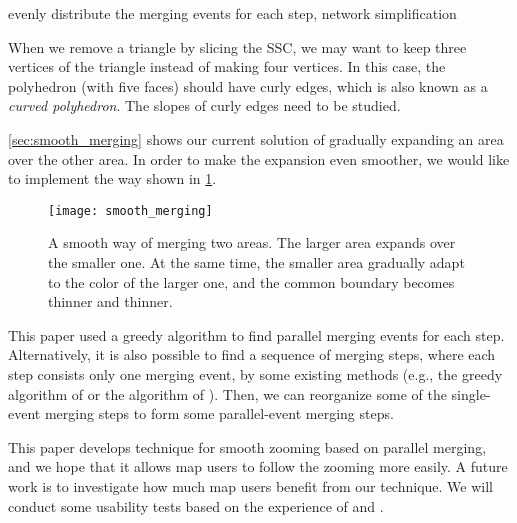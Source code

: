 \documentclass[ijgi,article,submit,moreauthors,pdftex]{Definitions/mdpi}
\begin{document}
evenly distribute the merging events for each step, 
network simplification

When we remove a triangle by slicing the SSC, 
we may want to keep three vertices of the triangle 
instead of making four vertices.
In this case, the polyhedron (with five faces) should have curly edges,
which is also known as a \emph{curved polyhedron}.
The slopes of curly edges need to be studied.

\sect\ref{sec:smooth_merging} shows our current solution of
gradually expanding an area over the other area.
In order to make the expansion even smoother,
we would like to implement the way 
shown in \fig\ref{fig:smooth_merging_future}.

\begin{figure}[tb]
\centering
\texttt{[image: smooth\_merging]}
\caption{A smooth way of merging two areas.
    The larger area expands over the smaller one.
    At the same time, 
    the smaller area gradually adapt to the color of the larger one,
    and the common boundary becomes thinner and thinner.}
\label{fig:smooth_merging_future}
\end{figure}

This paper used a greedy algorithm 
to find parallel merging events for each step.
Alternatively, it is also possible to find a sequence of merging steps,
where each step consists only one merging event, by some existing methods
(e.g., the greedy algorithm of \citet{vanOosterom2005}
or the \Astar algorithm of \citet[]{Peng2019Thesis}).
Then, we can reorganize some of the single-event merging steps 
to form some parallel-event merging steps.

This paper develops technique for smooth zooming based on parallel merging,
and we hope that it allows map users to follow the zooming more easily.
A future work is to investigate 
how much map users benefit from our technique.
We will conduct some usability tests based on the experience of
\citet[]{Suba2017Thesis} and \citet{Midtbo2007}.
\end{document}
